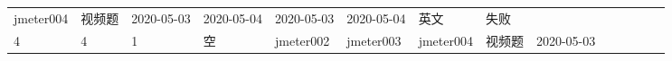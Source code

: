 \documentclass[hyperref, a4paper]{ctexart}
\begin{document}
\begin{longtable}[]{@{}llllllllllllll@{}}
\begin{minipage}[t]{0.04\columnwidth}
jmeter004\strut
\end{minipage} & \begin{minipage}[t]{0.02\columnwidth}\raggedright
视频题\strut
\end{minipage} & \begin{minipage}[t]{0.04\columnwidth}\raggedright
2020-05-03\strut
\end{minipage} & \begin{minipage}[t]{0.05\columnwidth}\raggedright
2020-05-04\strut
\end{minipage} & \begin{minipage}[t]{0.07\columnwidth}\raggedright
2020-05-03\strut
\end{minipage} & \begin{minipage}[t]{0.08\columnwidth}\raggedright
2020-05-04\strut
\end{minipage} & \begin{minipage}[t]{0.04\columnwidth}\raggedright
英文\strut
\end{minipage} & \begin{minipage}[t]{0.02\columnwidth}\raggedright
失败\strut
\end{minipage}\tabularnewline
\begin{minipage}[t]{0.01\columnwidth}\raggedright
4\strut
\end{minipage} & \begin{minipage}[t]{0.12\columnwidth}\raggedright
4\strut
\end{minipage} & \begin{minipage}[t]{0.03\columnwidth}\raggedright
1\strut
\end{minipage} & \begin{minipage}[t]{0.06\columnwidth}\raggedright
空\strut
\end{minipage} & \begin{minipage}[t]{0.04\columnwidth}\raggedright
jmeter002\strut
\end{minipage} & \begin{minipage}[t]{0.04\columnwidth}\raggedright
jmeter003\strut
\end{minipage} & \begin{minipage}[t]{0.04\columnwidth}\raggedright
jmeter004\strut
\end{minipage} & \begin{minipage}[t]{0.02\columnwidth}\raggedright
视频题\strut
\end{minipage} & \begin{minipage}[t]{0.04\columnwidth}\raggedright
2020-05-03\strut
\end{minipage} & \begin{minipage}[t]{0.05\columnwidth}\raggedright

\end{minipage}
\end{longtable}
\end{document}
